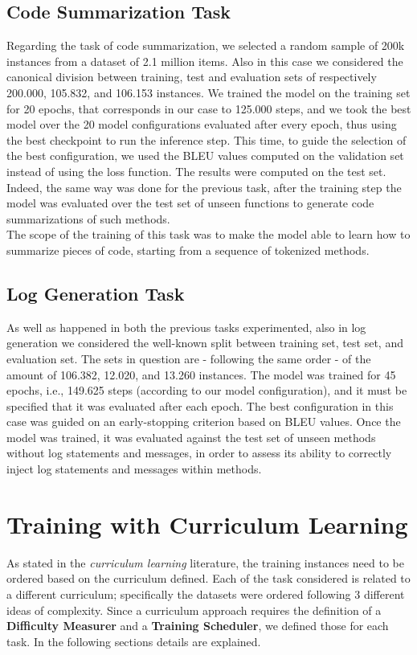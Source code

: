 \subsection{Code Summarization Task}
Regarding the task of code summarization, we selected a random sample of 200k instances from a dataset of 2.1 million items.
Also in this case we considered the canonical division between training, test and evaluation sets of respectively 200.000, 105.832, and 106.153 instances.
We trained the model on the training set for 20 epochs, that corresponds in our case to 125.000 steps, and we took the best model over the 20 model configurations evaluated after every epoch,
thus using the best checkpoint to run the inference step. This time, to guide the selection of the best configuration, we used the BLEU values computed on the validation set instead of using
the loss function. The results were computed on the test set. Indeed, the same way was done for the previous task, after the training step the model was
evaluated over the test set of unseen functions to generate code summarizations of such methods.\\
The scope of the training of this task 
was to make the model able to learn how to summarize pieces of code, starting from a sequence of tokenized methods.

\subsection{Log Generation Task}
As well as happened in both the previous tasks experimented, also in log generation we considered the well-known split between training set, test set, and evaluation set.
The sets in question are - following the same order - of the amount of 106.382, 12.020, and 13.260 instances. The model was trained for 45 epochs, i.e., 149.625 steps (according to our model configuration), and 
it must be specified that it was evaluated after each epoch. The best configuration in this case was guided on an early-stopping criterion based on BLEU values. 
Once the model was trained, it was evaluated against the test set of unseen methods without log statements and messages, in order to assess its ability to correctly inject log statements and messages within methods.

\section{Training with Curriculum Learning}\label{chapter:curriculum}
As stated in the \textit{curriculum learning} literature, the training instances need to be ordered based on the curriculum defined.
Each of the task considered is related to a different curriculum; specifically the datasets were ordered
following 3 different ideas of complexity. Since a curriculum approach requires the definition of a \textbf{Difficulty Measurer}
and a \textbf{Training Scheduler}, we defined those for each task. In the following sections details are explained.

